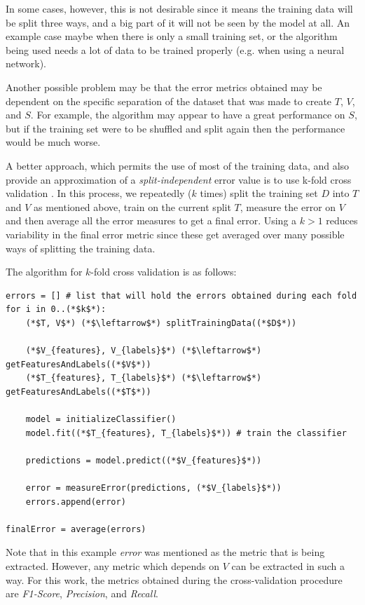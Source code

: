 \documentclass[epsfig,a4paper,11pt,titlepage,twoside,openany]{book}
\begin{document}
In some cases, however, this is not desirable since it means the training data will be split three ways, and a big part of it will not be seen by the model at all. An example case maybe when there is only a small training set, or the algorithm being used needs a lot of data to be trained properly (e.g. when using a neural network).

Another possible problem may be that the error metrics obtained may be dependent on the specific separation of the dataset that was made to create $T$, $V$, and $S$. For example, the algorithm may appear to have a great performance on $S$, but if the training set were to be shuffled and split again then the performance would be much worse.

A better approach, which permits the use of most of the training data, and also provide an approximation of a \textit{split-independent} error value is to use k-fold cross validation \cite{Kohavi:1995_study_of_cross_validation,Cawley:2010_crossval_model_selection}. In this process, we repeatedly ($k$ times) split the training set $D$ into $T$ and $V$ as mentioned above, train on the current split $T$, measure the error on $V$ and then average all the error measures to get a final error. Using a $k > 1$ reduces variability in the final error metric since these get averaged over many possible ways of splitting the training data.

The algorithm for $k$-fold cross validation is as follows:

\begin{lstlisting}
errors = [] # list that will hold the errors obtained during each fold
for i in 0..(*$k$*):
    (*$T, V$*) (*$\leftarrow$*) splitTrainingData((*$D$*))
    
    (*$V_{features}, V_{labels}$*) (*$\leftarrow$*) getFeaturesAndLabels((*$V$*))
    (*$T_{features}, T_{labels}$*) (*$\leftarrow$*) getFeaturesAndLabels((*$T$*))

    model = initializeClassifier()
    model.fit((*$T_{features}, T_{labels}$*)) # train the classifier
    
    predictions = model.predict((*$V_{features}$*))
    
    error = measureError(predictions, (*$V_{labels}$*))
    errors.append(error)
    
finalError = average(errors)
\end{lstlisting}

Note that in this example \textit{error} was mentioned as the metric that is being extracted. However, any metric which depends on $V$ can be extracted in such a way. For this work, the metrics obtained during the cross-validation procedure are \textit{F1-Score}, \textit{Precision}, and \textit{Recall}.
\end{document}
